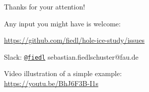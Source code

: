
\placelogotrue
\begin{frame}{Thanks for your attention!}
  \begin{center}
    Any input you might have is welcome: \\ \vspace{0.3cm}

    \url{https://github.com/fiedl/hole-ice-study/issues} \\ \vspace{0.1cm}

    Slack: \href{https://icecube-spno.slack.com/messages/@U092MBFU2}{\texttt{@fiedl}}
    sebastian.fiedlschuster@fau.de

    \vspace{1.5cm}

    \small{
      Video illustration of a simple example: \\
      \url{https://youtu.be/BhJ6F3B-I1s}
    }

  \end{center}
\end{frame}
\placelogofalse

